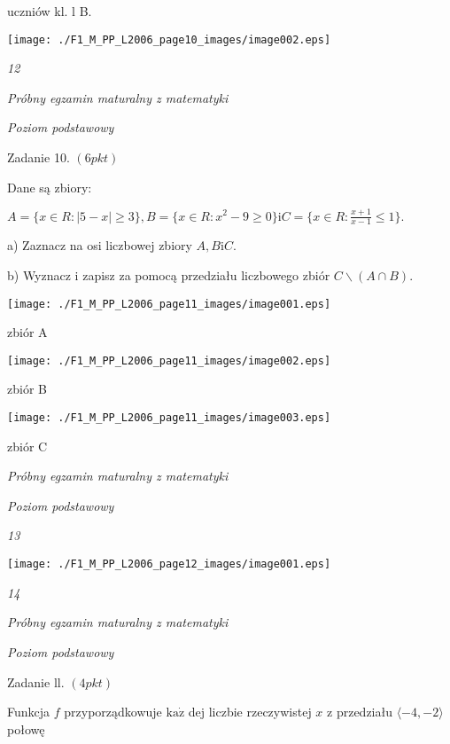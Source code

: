\documentclass[a4paper,12pt]{article}
\begin{document}
uczniów kl. l B.
\begin{center}
\texttt{[image: ./F1\_M\_PP\_L2006\_page10\_images/image002.eps]}
\end{center}




{\it 12}

{\it Próbny egzamin maturalny z matematyki}

{\it Poziom podstawowy}

Zadanie 10. $(6pkt)$

Dane są zbiory:

$A=\{x\in R:|5-x|\geq 3\}, B=\{x\in R:x^{2}-9\geq 0\} \mathrm{i} C=\displaystyle \{x\in R:\frac{x+1}{x-1}\leq 1\}.$

a) Zaznacz na osi liczbowej zbiory $A, B \mathrm{i}C.$

b) Wyznacz i zapisz za pomocą przedziału liczbowego zbiór $C\backslash (A\cap B).$
\begin{center}
\texttt{[image: ./F1\_M\_PP\_L2006\_page11\_images/image001.eps]}
\end{center}
zbiór A
\begin{center}
\texttt{[image: ./F1\_M\_PP\_L2006\_page11\_images/image002.eps]}
\end{center}
zbiór B
\begin{center}
\texttt{[image: ./F1\_M\_PP\_L2006\_page11\_images/image003.eps]}
\end{center}
zbiór C





{\it Próbny egzamin maturalny z matematyki}

{\it Poziom podstawowy}

{\it 13}
\begin{center}
\texttt{[image: ./F1\_M\_PP\_L2006\_page12\_images/image001.eps]}
\end{center}




{\it 14}

{\it Próbny egzamin maturalny z matematyki}

{\it Poziom podstawowy}

Zadanie ll. $(4pkt)$

Funkcja $f$ przyporządkowuje $\mathrm{k}\mathrm{a}\dot{\mathrm{z}}$ dej liczbie rzeczywistej $x$ z przedziału $\langle-4,-2\rangle$ połowę
\end{document}
